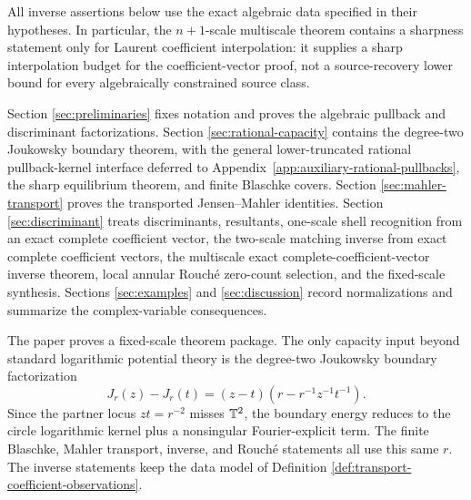 \endgroup
All inverse assertions below use the exact algebraic data specified in
their hypotheses.  In particular, the \(n+1\)-scale multiscale theorem
contains a sharpness statement only for Laurent coefficient interpolation:
it supplies a sharp interpolation budget for the coefficient-vector
proof, not a source-recovery lower bound for every algebraically
constrained source class.

Section \ref{sec:preliminaries} fixes notation and proves the algebraic
pullback and discriminant factorizations.  Section
\ref{sec:rational-capacity} contains the degree-two Joukowsky boundary
theorem, with the general lower-truncated rational pullback-kernel
interface deferred to Appendix~\ref{app:auxiliary-rational-pullbacks},
the sharp equilibrium theorem, and finite Blaschke covers.  Section
\ref{sec:mahler-transport} proves the transported Jensen--Mahler
identities.  Section \ref{sec:discriminant} treats discriminants,
resultants, one-scale shell recognition from an exact complete
coefficient vector, the two-scale matching inverse from exact complete
coefficient vectors, the multiscale exact complete-coefficient-vector
inverse theorem, local annular Rouch\'e zero-count selection, and
the fixed-scale synthesis.  Sections
\ref{sec:examples} and \ref{sec:discussion} record normalizations and
summarize the complex-variable consequences.

The paper proves a fixed-scale theorem package.  The only capacity input
beyond standard logarithmic potential theory is the degree-two Joukowsky
boundary factorization
\[
J_r(z)-J_r(t)=(z-t)\left(r-r^{-1}z^{-1}t^{-1}\right).
\]
Since the partner locus \(zt=r^{-2}\) misses \(\mathbb{T}^2\), the boundary
energy reduces to the circle logarithmic kernel plus a nonsingular
Fourier-explicit term.  The finite Blaschke, Mahler transport, inverse,
and Rouch\'e statements all use this same \(r\).  The inverse statements
keep the data model of Definition
\ref{def:transport-coefficient-observations}.

